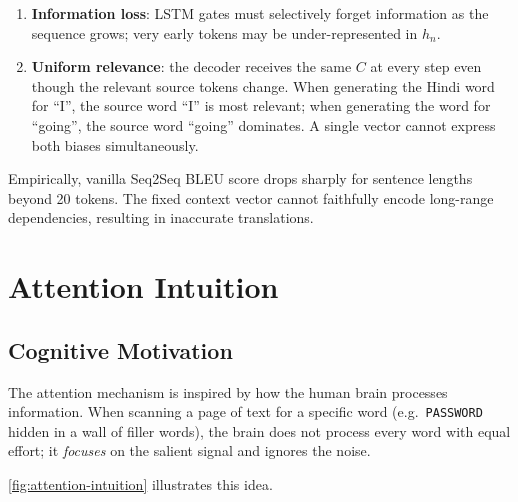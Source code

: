 \documentclass[12pt,a4paper]{article}
\begin{document}
\begin{enumerate}[label=(\alph*)]
  \item \textbf{Information loss}: LSTM gates must selectively forget
        information as the sequence grows; very early tokens may be
        under-represented in $h_n$.
  \item \textbf{Uniform relevance}: the decoder receives the same
        $C$ at every step even though the relevant source tokens
        change.  When generating the Hindi word for ``I'', the source
        word ``I'' is most relevant; when generating the word for
        ``going'', the source word ``going'' dominates.  A single
        vector cannot express both biases simultaneously.
\end{enumerate}

\begin{warningbox}
  Empirically, vanilla Seq2Seq BLEU score drops sharply for sentence
  lengths beyond 20 tokens.  The fixed context vector cannot
  faithfully encode long-range dependencies, resulting in inaccurate
  translations.
\end{warningbox}

\section{Attention Intuition}
\label{sec:intuition}

\subsection{Cognitive Motivation}

The attention mechanism is inspired by how the human brain processes
information.  When scanning a page of text for a specific word (e.g.\
\texttt{PASSWORD} hidden in a wall of filler words), the brain does
not process every word with equal effort; it \emph{focuses} on the
salient signal and ignores the noise.

\cref{fig:attention-intuition} illustrates this idea.
\end{document}
